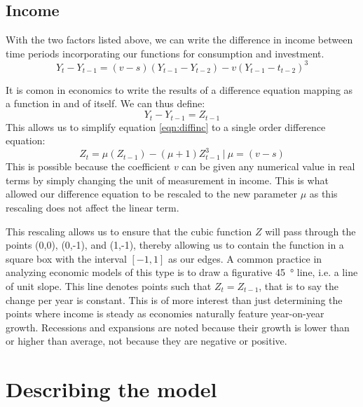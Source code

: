 \documentclass[]{article}
\begin{document}
	\subsection*{Income}
	With the two factors listed above, we can write the difference in income between time periods incorporating our functions for consumption and investment.
	\begin{equation}\label{eqn:diffinc}
		Y_t-Y_{t-1}=(v-s)(Y_{t-1}-Y_{t-2})-v(Y_{t-1}-t_{t-2})^3
	\end{equation}

	It is comon in economics to write the results of a difference equation mapping as a function in and of itself. We can thus define:
	\begin{equation}
		Y_t-Y_{t-1}=Z_{t-1}
	\end{equation}
	This allows us to simplify equation \ref{eqn:diffinc} to a single order difference equation:
	\begin{equation}
		Z_t=\mu(Z_{t-1})-(\mu+1)Z^3_{t-1}\ |\ \mu=(v-s)
	\end{equation}
	This is possible because the coefficient $v$ can be given any numerical value in real terms by simply changing the unit of measurement in income. This is what allowed our difference equation to be rescaled to the new parameter $\mu$ as this rescaling does not affect the linear term.

	This rescaling allows us to ensure that the cubic function $Z$ will pass through the points (0,0), (0,-1), and (1,-1), thereby allowing us to contain the function in a square box with the interval $[-1,1]$ as our edges. A common practice in analyzing economic models of this type is to draw a figurative \SI{45}{\degree} line, i.e. a line of unit slope. This line denotes points such that $Z_t=Z_{t-1}$, that is to say the change per year is constant. This is of more interest than just determining the points where income is steady as economies naturally feature year-on-year growth. Recessions and expansions are noted because their growth is lower than or higher than average, not because they are negative or positive.

	\section*{Describing the model}
\end{document}
